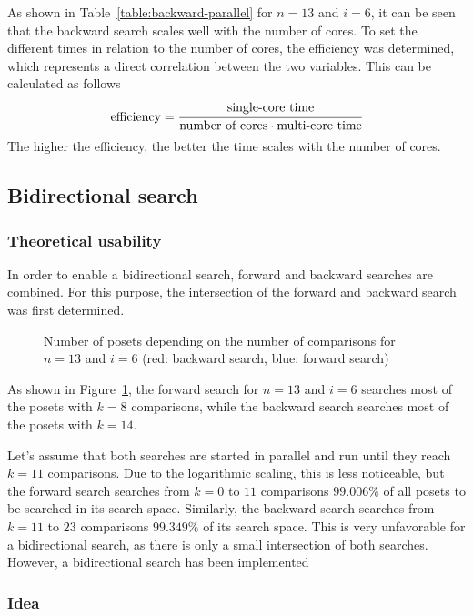 \documentclass[10pt,journal,compsoc]{IEEEtran}
\begin{document}
As shown in Table~\ref{table:backward-parallel} for $n = 13$ and $i = 6$, it can be seen that the backward search scales well with the number of cores.
To set the different times in relation to the number of cores, the efficiency was determined, which represents a direct correlation between the two variables.
This can be calculated as follows
\[
  \text{efficiency} = \cfrac{\text{single-core time}}{\text{number of cores} \cdot \text{multi-core time}}
\]
The higher the efficiency, the better the time scales with the number of cores.


\subsection{Bidirectional search} \label{sec:bidirectional}

\subsubsection{Theoretical usability}

In order to enable a bidirectional search, forward and backward searches are combined.
For this purpose, the intersection of the forward and backward search was first determined.

\begin{figure}[!b]
  \centering
  
  \caption{Number of posets depending on the number of comparisons for $n = 13$ and $i = 6$ (red: backward search, blue: forward search)}
  \label{fig:backward_forward_count_13_6}
\end{figure}

As shown in Figure~\ref{fig:backward_forward_count_13_6}, the forward search for $n = 13$ and $i = 6$ searches most of the posets with $k = 8$ comparisons, while the backward search searches most of the posets with $k = 14$.

Let's assume that both searches are started in parallel and run until they reach $k = 11$ comparisons.
Due to the logarithmic scaling, this is less noticeable, but the forward search searches from $k = 0$ to $11$ comparisons $99.006\%$ of all posets to be searched in its search space.
Similarly, the backward search searches from $k = 11$ to $23$ comparisons $99.349\%$ of its search space.
This is very unfavorable for a bidirectional search, as there is only a small intersection of both searches.
However, a bidirectional search has been implemented

\subsubsection{Idea}
\end{document}
